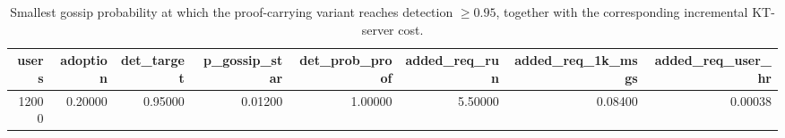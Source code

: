 \begin{table}
\caption{Smallest gossip probability at which the proof-carrying variant reaches detection $\ge 0.95$, together with the corresponding incremental KT-server cost.}
\label{tab:server-cost-sweet-spot}
\begin{tabular}{rrrrrrrr}
\toprule
users & adoption & det_target & p_gossip_star & det_prob_proof & added_req_run & added_req_1k_msgs & added_req_user_hr \\
\midrule
12000 & 0.20000 & 0.95000 & 0.01200 & 1.00000 & 5.50000 & 0.08400 & 0.00038 \\
\bottomrule
\end{tabular}
\end{table}
